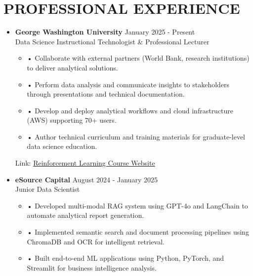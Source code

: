 \documentclass[a4paper,9pt]{extarticle}
\begin{document}

\section*{PROFESSIONAL EXPERIENCE}

\begin{itemize}[leftmargin=0.4cm, label={}]
    \item \textbf{George Washington University} \hfill January 2025 - Present \\
    Data Science Instructional Technologist \& Professional Lecturer
    \vspace{-0.1cm}
    \begin{itemize}[leftmargin=0.3cm, label={}]
    \item \small{•} \normalsize{Collaborate with external partners (World Bank, research institutions) to deliver analytical solutions.}
    \item \small{•} \normalsize{Perform data analysis and communicate insights to stakeholders through presentations and technical documentation.}
    \item \small{•} \normalsize{Develop and deploy analytical workflows and cloud infrastructure (AWS) supporting 70+ users.}
    \item \small{•} \normalsize{Author technical curriculum and training materials for graduate-level data science education.}
    \end{itemize}
    Link: \href{https://twallett.com/courses/reinforcement-learning/}{Reinforcement Learning Course Website}
\end{itemize}

\noindent
\begin{itemize}[leftmargin=0.4cm, label={}]
    \item \textbf{eSource Capital} \hfill August 2024 - January 2025 \\
    Junior Data Scientist 
    \vspace{-0.1cm}
    \begin{itemize}[leftmargin=0.3cm, label={}]
    \item \small{•} \normalsize{Developed multi-modal RAG system using GPT-4o and LangChain to automate analytical report generation.}
    \item \small{•} \normalsize{Implemented semantic search and document processing pipelines using ChromaDB and OCR for intelligent retrieval.}
    \item \small{•} \normalsize{Built end-to-end ML applications using Python, PyTorch, and Streamlit for business intelligence analysis.}
\end{itemize}
\end{itemize}
\end{document}
